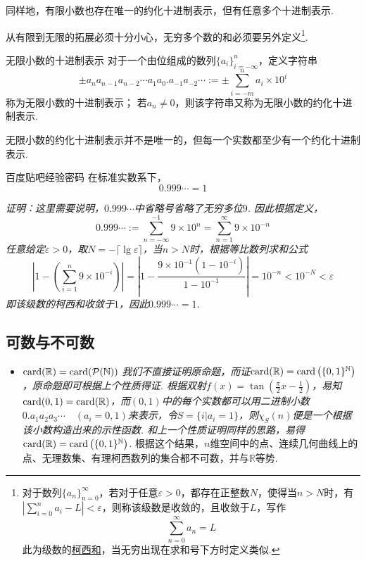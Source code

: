 同样地，有限小数也存在唯一的约化十进制表示，但有任意多个十进制表示.

从有限到无限的拓展必须十分小心，无穷多个数的和必须要另外定义\footnote{对于数列\(\{a_n\}_{n=0}^{\infty}\)，若对于任意\(\varepsilon > 0\)，都存在正整数\(N\)，使得当\(n>N\)时，有\(\displaystyle{\left|\sum_{i=0}^{n}a_i-L\right| < \varepsilon}\)，则称该级数是收敛的，且收敛于\(L\)，写作\[\sum_{n=0}^{\infty}a_n=L\]此为级数的\underline{柯西和}，当无穷出现在求和号下方时定义类似.}.

\begin{definition}{无限小数的十进制表示}
    对于一个由位组成的数列\(\{a_i\}_{i=-\infty}^n\)，定义字符串
    \[\pm a_n a_{n-1} a_{n-2} \cdots a_1 a_0.a_{-1} a_{-2} \cdots := \pm \sum_{i=-m}^{n} a_i \times 10^i\]
    称为无限小数的十进制表示；
    \newline
    若\(a_n \neq 0\)，则该字符串又称为无限小数的约化十进制表示.
\end{definition}

无限小数的约化十进制表示并不是唯一的，但每一个实数都至少有一个约化十进制表示.

\begin{proposition}{百度贴吧经验密码}
    在标准实数系下，
    \[0.999\cdots = 1\]
\end{proposition}
\textit{
    证明：这里需要说明，\(0.999\cdots\)中省略号省略了无穷多位\(9\). 因此根据定义，
    \[0.999\cdots := \sum_{n=-\infty}^{-1} 9 \times 10^{n} = \sum_{n=1}^{\infty} 9 \times 10^{-n}\]
    任意给定\(\varepsilon > 0\)，取\(N=-\lceil\lg \varepsilon\rceil\)，当\(n>N\)时，根据等比数列求和公式
    \[\left| 1-\left(\sum_{i=1}^{n} 9 \times 10^{-i}\right) \right| = \left| 1-\frac{9\times 10^{-1}(1-10^{-i})}{1-10^{-1}} \right| =10^{-n}<10^{-N}<\varepsilon\]
    即该级数的柯西和收敛于\(1\)，因此\(0.999\cdots = 1\).
}


\subsection{可数与不可数}

\begin{itemize}
    \item [(4)] \({\rm card}(\mathbb{R}) = {\rm card}(\mathcal{P}(\mathbb{N})) \)
    \newline
    \textit{
        我们不直接证明原命题，而证\({\rm card}(\mathbb{R})={\rm card}\left(\{0,1\}^\mathbb{N}\right)\)，原命题即可根据上个性质得证.
        \newline
        根据双射\(f(x)=\tan\left(\frac{\pi}{2}x-\frac{1}{2}\right)\)，易知\({\rm card}(0,1)={\rm card}(\mathbb{R})\)，而\((0,1)\)中的每个实数都可以用二进制小数\(0.a_1a_2a_3\cdots\quad(a_i=0,1)\)来表示，令\(S=\{i|a_i=1\}\)，则\(\chi_S(n)\)便是一个根据该小数构造出来的示性函数. 和上一个性质证明同样的思路，易得\({\rm card}(\mathbb{R})={\rm card}\left(\{0,1\}^\mathbb{N}\right)\).
    }
    根据这个结果，\(n\)维空间中的点、连续几何曲线上的点、无理数集、有理柯西数列的集合都不可数，并与\(\mathbb{R}\)等势.
    
\end{itemize}

